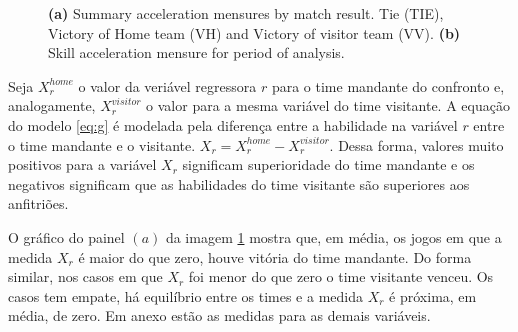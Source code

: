 \documentclass[doc,apacite,oneside,a4paper,12pt]{apa6}
\begin{document}
\begin{figure}%
    \centering
    \qquad
    \caption[\scriptsize{Summary acceleration mensure.}]{\scriptsize{ \textbf{(a)} Summary acceleration mensures by match result. Tie (TIE), Victory of Home team (VH) and Victory of visitor team (VV). \textbf{(b)} Skill acceleration mensure for period of analysis. }}
    \label{fig:summary}%
\end{figure}


Seja $X^{home}_{r}$ o valor da veriável regressora $r$ para o time mandante do confronto e, analogamente, $X^{visitor}_{r}$ o valor para a mesma variável do time visitante. A equação do modelo \ref{eq:g} é modelada pela diferença entre a habilidade na variável $r$ entre o time mandante e o visitante. $X_{r} = X^{home}_{r}-X^{visitor}_{r}$. Dessa forma, valores muito positivos para a variável $X_{r}$ significam superioridade do time mandante e os negativos significam que as habilidades do time visitante são superiores aos anfitriões.


O gráfico do painel $(a)$ da imagem \ref{fig:summary} mostra que, em média, os jogos em que a medida $X_r$ é maior do que zero, houve vitória do time mandante. Do forma similar, nos casos em que $X_r$ foi menor do que zero o time visitante venceu. Os casos tem empate, há equilíbrio entre os times e a medida $X_r$ é próxima, em média, de zero. Em anexo estão as medidas para as demais variáveis.
\end{document}
